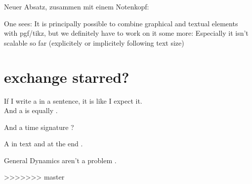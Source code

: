 \documentclass{scrartcl}
\begin{document}
\normalsize
Neuer Absatz, zusammen mit einem Notenkopf: 

One sees: It is principally possible to combine graphical and textual elements with pgf/tikz,
but we definitely have to work on it some more: Especially it isn't scalable so far (explicitely or implicitely following text size)

\section*{exchange starred?}

If I write a \flat in a sentence, it is like I expect it.\\
And a \lilyRFZ is equally \lilyRF.

And a time signature ?

A \lilyRFZ in text and at the end \lilyRFZ*.

General Dynamics  aren't a problem .


	
>>>>>>> master
\end{document}
